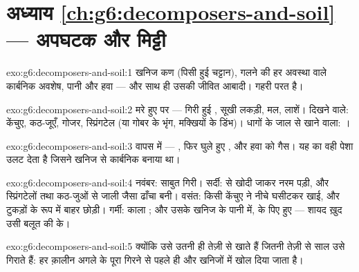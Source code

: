 \section*{अध्याय \ref{ch:g6:decomposers-and-soil} --- अपघटक और मिट्टी}

\begin{solution}{exo:g6:decomposers-and-soil:1}
खनिज कण (पिसी हुई चट्टान), गलने की हर अवस्था वाले कार्बनिक अवशेष, पानी
और हवा --- और साथ ही उसकी जीवित आबादी। गहरी परत  है।
\end{solution}

\begin{solution}{exo:g6:decomposers-and-soil:2}
मरे हुए  पर --- गिरी हुई , सूखी लकड़ी, मल,
लाशें। दिखने वाले: केंचुए, कठ-जूएँ, गोजर, स्प्रिंगटेल (या गोबर के भृंग,
मक्खियों के डिंभ)। धागों के जाल से खाने वाला: ।
\end{solution}

\begin{solution}{exo:g6:decomposers-and-soil:3}
वापस  में --- , फिर घुले हुए , और हवा को गैस।
यह  का वही पेशा उलट देता है जिसने खनिज से कार्बनिक बनाया था।
\end{solution}

\begin{solution}{exo:g6:decomposers-and-soil:4}
नवंबर: साबुत गिरी। सर्दी:  से खोदी जाकर नरम पड़ी, और स्प्रिंगटेलों
तथा कठ-जुओं से जाली जैसा ढाँचा बनी। वसंत: किसी केंचुए ने नीचे घसीटकर
खाई, और टुकड़ों के रूप में बाहर छोड़ी। गर्मी: काला ; और उसके खनिज
 के पानी में,  के पिए हुए --- शायद ख़ुद उसी बलूत की 
के।
\end{solution}

\begin{solution}{exo:g6:decomposers-and-soil:5}
क्योंकि  उसे उतनी ही तेज़ी से खाते हैं जितनी तेज़ी से साल उसे
गिराते हैं: हर क़ालीन अगले के पूरा गिरने से पहले ही  और खनिजों में
खोल दिया जाता है।
\end{solution}

